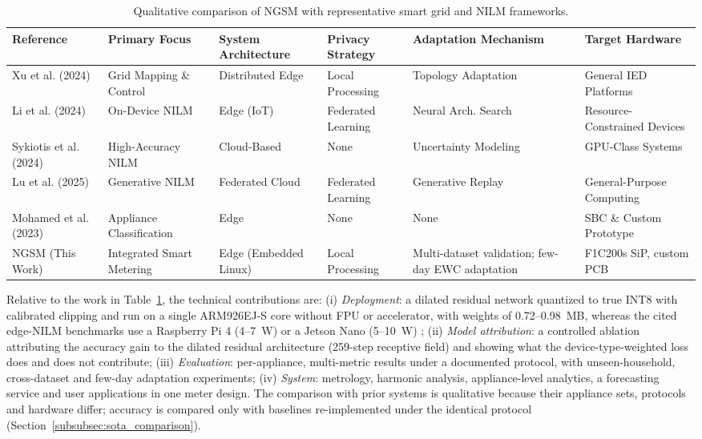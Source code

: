 \documentclass[fleqn,10pt]{wlscirep}
\begin{document}
\begin{table}[!t]
\centering
\caption{Qualitative comparison of NGSM with representative smart grid and NILM frameworks.}
\label{tab:qualitative_comparison}
\footnotesize
\begin{tabular}{@{}p{2.8cm}p{2.2cm}p{2.0cm}p{2.0cm}p{2.2cm}p{2.2cm}@{}}
\toprule
Reference & Primary Focus & System Architecture & Privacy Strategy & Adaptation Mechanism & Target Hardware \\
\midrule
Xu et al. (2024) \cite{Xu2024}
& Grid Mapping \& Control
& Distributed Edge
& Local Processing
& Topology Adaptation
& General IED Platforms \\

Li et al. (2024) \cite{Li2024}
& On-Device NILM
& Edge (IoT)
& Federated Learning
& Neural Arch. Search
& Resource-Constrained Devices \\

Sykiotis et al. (2024) \cite{Sykiotis2024}
& High-Accuracy NILM
& Cloud-Based
& None
& Uncertainty Modeling
& GPU-Class Systems \\

Lu et al. (2025) \cite{SciRep2025}
& Generative NILM
& Federated Cloud
& Federated Learning
& Generative Replay
& General-Purpose Computing \\

Mohamed et al. (2023) \cite{ngsmconference}
& Appliance Classification
& Edge
& None
& None
& SBC \& Custom Prototype \\
\midrule

NGSM (This Work)
& Integrated Smart Metering
& Edge (Embedded Linux)
& Local Processing
& Multi-dataset validation; few-day EWC adaptation
& F1C200s SiP, custom PCB \\

\bottomrule
\end{tabular}
\end{table}

Relative to the work in Table~\ref{tab:qualitative_comparison}, the technical contributions are: (i) \textit{Deployment}: a dilated residual network quantized to true INT8 with calibrated clipping and run on a single ARM926EJ-S core without FPU or accelerator, with weights of 0.72--0.98~MB, whereas the cited edge-NILM benchmarks use a Raspberry Pi 4 (4--7~W) or a Jetson Nano (5--10~W) \cite{EdgeNILM2025, Xu2024VMD}; (ii) \textit{Model attribution}: a controlled ablation attributing the accuracy gain to the dilated residual architecture (259-step receptive field) and showing what the device-type-weighted loss does and does not contribute; (iii) \textit{Evaluation}: per-appliance, multi-metric results under a documented protocol, with unseen-household, cross-dataset and few-day adaptation experiments; (iv) \textit{System}: metrology, harmonic analysis, appliance-level analytics, a forecasting service and user applications in one meter design. The comparison with prior systems is qualitative because their appliance sets, protocols and hardware differ; accuracy is compared only with baselines re-implemented under the identical protocol (Section~\ref{subsubsec:sota_comparison}).
\end{document}
